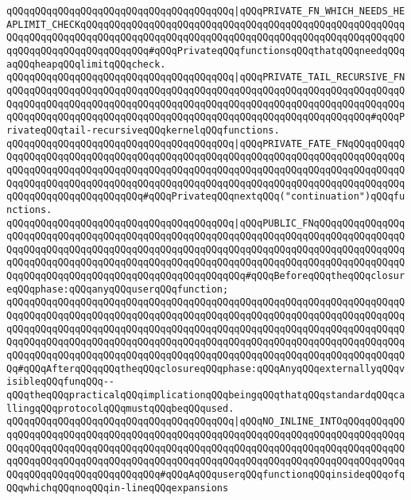 \verb|qQQqqQQqqQQqqQQqqQQqqQQqqQQqqQQqqQQqqQQq|\verb#|qQQqPRIVATE_FN_WHICH_NEEDS_HEAPLIMIT_CHECKqQQqqQQqqQQqqQQqqQQqqQQqqQQqqQQqqQQqqQQqqQQqqQQqqQQqqQQqqQQqqQQqqQQqqQQqqQQqqQQqqQQqqQQqqQQqqQQqqQQqqQQqqQQqqQQqqQQqqQQqqQQqqQQqqQQqqQQqqQQqqQQqqQQqqQQq#\verb|#qQQqPrivateqQQqfunctionsqQQqthatqQQqneedqQQqaqQQqheapqQQqlimitqQQqcheck.|\newline
\verb|qQQqqQQqqQQqqQQqqQQqqQQqqQQqqQQqqQQqqQQq|\verb#|qQQqPRIVATE_TAIL_RECURSIVE_FNqQQqqQQqqQQqqQQqqQQqqQQqqQQqqQQqqQQqqQQqqQQqqQQqqQQqqQQqqQQqqQQqqQQqqQQqqQQqqQQqqQQqqQQqqQQqqQQqqQQqqQQqqQQqqQQqqQQqqQQqqQQqqQQqqQQqqQQqqQQqqQQqqQQqqQQqqQQqqQQqqQQqqQQqqQQqqQQqqQQqqQQqqQQqqQQqqQQqqQQqqQQq#\verb|#qQQqPrivateqQQqtail-recursiveqQQqkernelqQQqfunctions.|\newline
\verb|qQQqqQQqqQQqqQQqqQQqqQQqqQQqqQQqqQQqqQQq|\verb#|qQQqPRIVATE_FATE_FNqQQqqQQqqQQqqQQqqQQqqQQqqQQqqQQqqQQqqQQqqQQqqQQqqQQqqQQqqQQqqQQqqQQqqQQqqQQqqQQqqQQqqQQqqQQqqQQqqQQqqQQqqQQqqQQqqQQqqQQqqQQqqQQqqQQqqQQqqQQqqQQqqQQqqQQqqQQqqQQqqQQqqQQqqQQqqQQqqQQqqQQqqQQqqQQqqQQqqQQqqQQqqQQqqQQqqQQqqQQqqQQqqQQqqQQqqQQqqQQqqQQq#\verb|#qQQqPrivateqQQqnextqQQq("continuation")qQQqfunctions.|\newline
\newline
\verb|qQQqqQQqqQQqqQQqqQQqqQQqqQQqqQQqqQQqqQQq|\verb#|qQQqPUBLIC_FNqQQqqQQqqQQqqQQqqQQqqQQqqQQqqQQqqQQqqQQqqQQqqQQqqQQqqQQqqQQqqQQqqQQqqQQqqQQqqQQqqQQqqQQqqQQqqQQqqQQqqQQqqQQqqQQqqQQqqQQqqQQqqQQqqQQqqQQqqQQqqQQqqQQqqQQqqQQqqQQqqQQqqQQqqQQqqQQqqQQqqQQqqQQqqQQqqQQqqQQqqQQqqQQqqQQqqQQqqQQqqQQqqQQqqQQqqQQqqQQqqQQqqQQqqQQqqQQqqQQqqQQqqQQq#\verb|#qQQqBeforeqQQqtheqQQqclosureqQQqphase:qQQqanyqQQquserqQQqfunction;|\newline
\verb|qQQqqQQqqQQqqQQqqQQqqQQqqQQqqQQqqQQqqQQqqQQqqQQqqQQqqQQqqQQqqQQqqQQqqQQqqQQqqQQqqQQqqQQqqQQqqQQqqQQqqQQqqQQqqQQqqQQqqQQqqQQqqQQqqQQqqQQqqQQqqQQqqQQqqQQqqQQqqQQqqQQqqQQqqQQqqQQqqQQqqQQqqQQqqQQqqQQqqQQqqQQqqQQqqQQqqQQqqQQqqQQqqQQqqQQqqQQqqQQqqQQqqQQqqQQqqQQqqQQqqQQqqQQqqQQqqQQqqQQqqQQqqQQqqQQqqQQqqQQqqQQqqQQqqQQqqQQqqQQqqQQqqQQqqQQqqQQqqQQqqQQqqQQqqQQq#qQQqAfterqQQqqQQqtheqQQqclosureqQQqphase:qQQqAnyqQQqexternallyqQQqvisibleqQQqfunqQQq--qQQqtheqQQqpracticalqQQqimplicationqQQqbeingqQQqthatqQQqstandardqQQqcallingqQQqprotocolqQQqmustqQQqbeqQQqused.|\newline
\newline
\verb|qQQqqQQqqQQqqQQqqQQqqQQqqQQqqQQqqQQqqQQq|\verb#|qQQqNO_INLINE_INTOqQQqqQQqqQQqqQQqqQQqqQQqqQQqqQQqqQQqqQQqqQQqqQQqqQQqqQQqqQQqqQQqqQQqqQQqqQQqqQQqqQQqqQQqqQQqqQQqqQQqqQQqqQQqqQQqqQQqqQQqqQQqqQQqqQQqqQQqqQQqqQQqqQQqqQQqqQQqqQQqqQQqqQQqqQQqqQQqqQQqqQQqqQQqqQQqqQQqqQQqqQQqqQQqqQQqqQQqqQQqqQQqqQQqqQQqqQQqqQQqqQQqqQQq#\verb|#qQQqAqQQquserqQQqfunctionqQQqinsideqQQqofqQQqwhichqQQqnoqQQqin-lineqQQqexpansions|\newline

